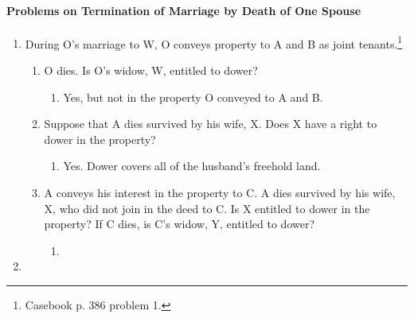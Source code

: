\paragraph{Problems on Termination of Marriage by Death of One Spouse}

\begin{enumerate}
    \item During O's marriage to W, O conveys property to A and B as joint 
    tenants.\footnote{Casebook p. 386 problem 1.}
    \begin{enumerate}
        \item O dies. Is O's widow, W, entitled to dower?
        \begin{enumerate}
            \item Yes, but not in the property O conveyed to A and B.
        \end{enumerate}
        \item Suppose that A dies survived by his wife, X. Does X have a right 
        to dower in the property?
        \begin{enumerate}
            \item Yes. Dower covers all of the husband's freehold land.
        \end{enumerate}
        \item A conveys his interest in the property to C. A dies survived by 
        his wife, X, who did not join in the deed to C. Is X entitled to dower 
        in the property? If C dies, is C's widow, Y, entitled to dower?
        \begin{enumerate}
            \item %
        \end{enumerate}
    \end{enumerate}
    \item %
\end{enumerate}
